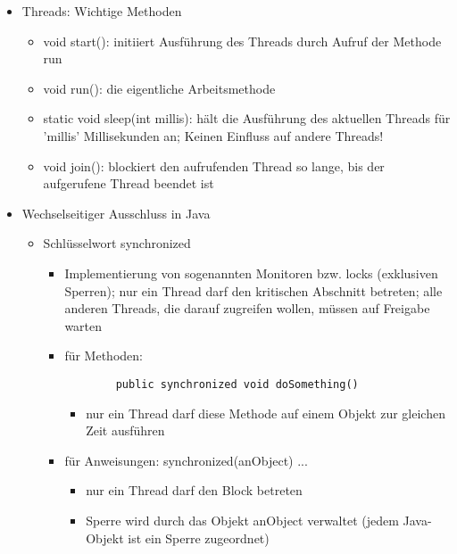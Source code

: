 \documentclass[10pt]{article}
\begin{document}
\begin{itemize}
\begin{lstlisting}[
        language=java,
        showspaces=false,
        basicstyle=\ttfamily
     ]
        public static void main(String[] args) {
            Thread t = new Thread(new Heartbeat(2)); //Thread Objekt mit runnable erzeugen
            t.start(); //methode start() aufrufen $\rightarrow$ ruft run() auf
        }
    \end{lstlisting}
  \item Threads: Wichtige Methoden
        \begin{itemize}
          \item void start(): initiiert Ausführung des Threads durch Aufruf der Methode run
          \item void run(): die eigentliche Arbeitsmethode
          \item static void sleep(int millis): hält die Ausführung des aktuellen Threads für 'millis' Millisekunden an; Keinen Einfluss auf andere Threads!
          \item void join(): blockiert den aufrufenden Thread so lange, bis der aufgerufene Thread beendet ist
        \end{itemize}
  \item Wechselseitiger Ausschluss in Java
        \begin{itemize}
          \item Schlüsselwort synchronized
                \begin{itemize}
                  \item Implementierung von sogenannten Monitoren bzw. locks (exklusiven Sperren); nur ein Thread darf den kritischen Abschnitt betreten; alle anderen Threads, die darauf zugreifen wollen, müssen auf Freigabe warten
                  \item für Methoden:
                        \begin{lstlisting}
        public synchronized void doSomething()
    \end{lstlisting}
                        \begin{itemize}
                          \item nur ein Thread darf diese Methode auf einem Objekt zur gleichen Zeit ausführen
                        \end{itemize}
                  \item für Anweisungen: synchronized(anObject) { ... }
                        \begin{itemize}
                          \item nur ein Thread darf den Block betreten
                          \item Sperre wird durch das Objekt anObject verwaltet (jedem Java-Objekt ist ein Sperre zugeordnet)

\end{itemize}
\end{itemize}
\end{itemize}
\end{itemize}
\end{document}

